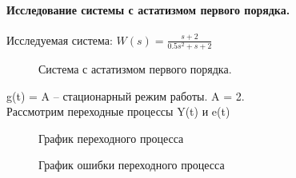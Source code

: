 \documentclass[a4paper, 11pt]{article}
\begin{document}
\paragraph{Исследование системы с астатизмом первого порядка.}

Исследуемая система: \large{$W(s)=\frac{s+2}{0.5s^2+s+2}$}


\begin{figure}[h!]
    \caption{Система с астатизмом первого порядка.}
    \label{one}
\end{figure}

g(t) = A – стационарный режим работы. A = 2.\\

Рассмотрим переходные процессы Y(t) и e(t)

\begin{figure}[h!]
    \caption{График переходного процесса}
    \label{two}
\end{figure}
\begin{figure}[h!]
    \caption{График ошибки переходного процесса}
    \label{tree}
\end{figure}
\end{document}
